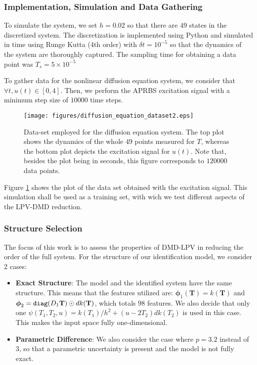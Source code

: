 \subsubsection{Implementation, Simulation and Data Gathering}

To simulate the system, we set $h = 0.02$ so that there are $49$ states in the discretized system.
%
The discretization is implemented using Python and simulated in time using Runge Kutta (4th order) with $\delta t = 10^{-5}$ so that the dynamics of the system are thoroughly captured.
%
The sampling time for obtaining a data point was $T_s =  5 \times 10^{-5}$

To gather data for the nonlinear diffusion equation system, we consider that $\forall t, u(t) \in [0,4]$.
%
Then, we perform the APRBS excitation signal with a minimum step size of $10000$ time steps.

\begin{figure}[h!]
    \centering
    \texttt{[image: figures/diffusion\_equation\_dataset2.eps]}
    \caption{Data-set employed for the diffusion equation system. The top plot shows the dynamics of the whole $49$ points measured for $T$, whereas the bottom plot depicts the excitation signal for $u(t)$. Note that, besides the plot being in seconds, this figure corresponds to $120000$ data points.}
    \label{fig:diff_equation_dataset}
\end{figure}

Figure \ref{fig:diff_equation_dataset} shows the plot of the data set obtained with the excitation signal.
%
This simulation shall be used as a training set, with wich we test different aspects of the LPV-DMD reduction.

\subsubsection{Structure Selection}

The focus of this work is to assess the properties of DMD-LPV in reducing the order of the full system.
%
For the structure of our identification model, we consider $2$ cases:

\begin{itemize}
    \item \textbf{Exact Structure}: The model and the identified system have the same structure. This means that the features utilized are: $\boldsymbol{\phi}_1(\mathbf{T}) = k(\mathbf{T})$ and $\boldsymbol{\phi}_2 = {\tt diag}(D_1\mathbf{T}) \odot dk(\mathbf{T})$, which totals $98$ features.
    We also decide that only one $\psi(T_1,T_2,u) = k(T_1)/h^2 + (u - 2T_2)dk(T_2)$ is used in this case.
    This makes the input space fully one-dimensional.
    \item \textbf{Parametric Difference}: We also consider the case where $p = 3.2$ instead of $3$, so that a parametric uncertainty is present and the model is not fully exact.
\end{itemize}

